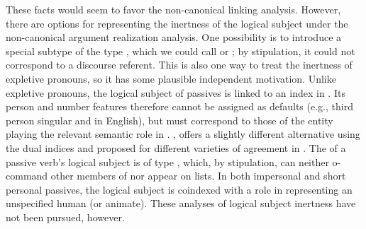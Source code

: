 \documentclass[output=paper
                ,modfonts
                ,nonflat
	        ,collection
	        ,collectionchapter
	        ,collectiontoclongg
 	        ,biblatex
                ,babelshorthands
                ,newtxmath
                ,draftmode
                ,colorlinks, citecolor=brown
]{./langsci/langscibook}
\begin{document}
These facts would seem to favor the non-canonical linking analysis.
However, there are options for representing the inertness of the logical subject under the non-canonical argument realization analysis.
One possibility is to introduce a special subtype of the type , which we could call  or ; by stipulation, it could not correspond to a discourse referent.
This is also one way to treat the inertness of expletive pronouns, so it has some plausible independent motivation.
Unlike expletive pronouns, the logical subject of passives is linked to an index in .
Its person and number features therefore cannot be assigned as defaults (e.g., third person singular  and  in English), but must correspond to those of the entity playing the relevant semantic role in .
\citet{Davis2001}, offers a slightly different alternative using the dual indices  and  proposed for different varieties of agreement in \citet{Kathol1999b}.
The  of a passive verb's logical subject is of type , which, by stipulation, can neither o-command other members of \argst nor appear on \val lists.
In both impersonal and short personal passives, the logical subject is coindexed with a role in  representing an unspecified human (or animate).
These analyses of logical subject inertness have not been pursued, however.

\end{document}
